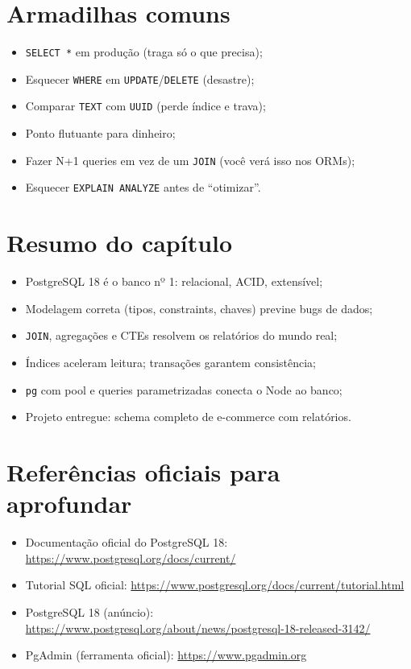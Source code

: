 \section{Armadilhas comuns}

\begin{itemize}[leftmargin=*, itemsep=0.4em]
  \item \texttt{SELECT *} em produção (traga só o que precisa);
  \item Esquecer \texttt{WHERE} em \texttt{UPDATE}/\texttt{DELETE} (desastre);
  \item Comparar \texttt{TEXT} com \texttt{UUID} (perde índice e trava);
  \item Ponto flutuante para dinheiro;
  \item Fazer N+1 queries em vez de um \texttt{JOIN} (você verá isso nos ORMs);
  \item Esquecer \texttt{EXPLAIN ANALYZE} antes de ``otimizar''.
\end{itemize}

\section{Resumo do capítulo}

\begin{itemize}[leftmargin=*, itemsep=0.3em]
  \item PostgreSQL 18 é o banco nº 1: relacional, ACID, extensível;
  \item Modelagem correta (tipos, constraints, chaves) previne bugs de dados;
  \item \texttt{JOIN}, agregações e CTEs resolvem os relatórios do mundo real;
  \item Índices aceleram leitura; transações garantem consistência;
  \item \texttt{pg} com pool e queries parametrizadas conecta o Node ao banco;
  \item Projeto entregue: schema completo de e-commerce com relatórios.
\end{itemize}

\section{Referências oficiais para aprofundar}

\begin{itemize}[leftmargin=*, itemsep=0.3em]
  \item Documentação oficial do PostgreSQL 18: \url{https://www.postgresql.org/docs/current/}
  \item Tutorial SQL oficial: \url{https://www.postgresql.org/docs/current/tutorial.html}
  \item PostgreSQL 18 (anúncio): \url{https://www.postgresql.org/about/news/postgresql-18-released-3142/}
  \item PgAdmin (ferramenta oficial): \url{https://www.pgadmin.org}
\end{itemize}
